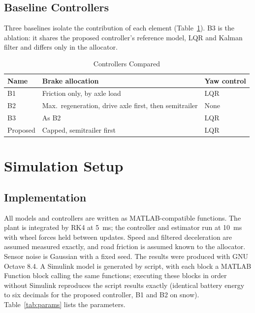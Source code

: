 \documentclass[conference]{IEEEtran}
\begin{document}
\subsection{Baseline Controllers}
Three baselines isolate the contribution of each element (Table~\ref{tab:baselines}). B3 is the ablation: it shares the proposed controller's reference model, LQR and Kalman filter and differs only in the allocator.

\begin{table}[t]
\caption{Controllers Compared}
\label{tab:baselines}
\centering
\begin{tabular}{@{}lp{3.5cm}l@{}}
\toprule
Name & Brake allocation & Yaw control\\
\midrule
B1 & Friction only, by axle load & LQR\\
B2 & Max.\ regeneration, drive axle first, then semitrailer & None\\
B3 & As B2 & LQR\\
Proposed & Capped, semitrailer first & LQR\\
\bottomrule
\end{tabular}
\end{table}

\section{Simulation Setup}

\subsection{Implementation}
All models and controllers are written as MATLAB-compatible functions. The plant is integrated by RK4 at \SI{5}{ms}; the controller and estimator run at \SI{10}{ms} with wheel forces held between updates. Speed and filtered deceleration are assumed measured exactly, and road friction is assumed known to the allocator. Sensor noise is Gaussian with a fixed seed. The results were produced with GNU Octave 8.4. A Simulink model is generated by script, with each block a MATLAB Function block calling the same functions; executing these blocks in order without Simulink reproduces the script results exactly (identical battery energy to six decimals for the proposed controller, B1 and B2 on snow). Table~\ref{tab:params} lists the parameters.
\end{document}
